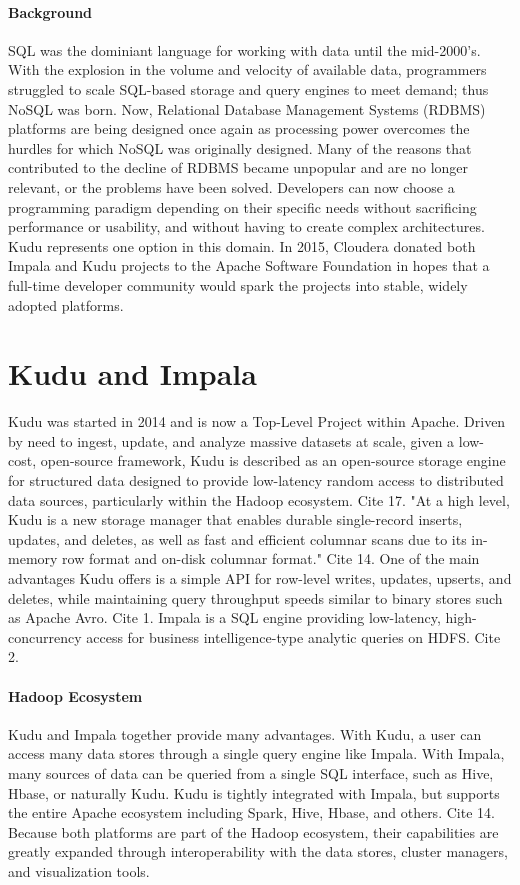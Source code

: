 \paragraph{Background}
SQL was the dominiant language for working with data until the mid-2000's.  With the explosion in the volume and velocity of available data, programmers struggled to scale SQL-based storage and query engines to meet demand; thus NoSQL was born. Now, Relational Database Management Systems (RDBMS) platforms are being designed once again as processing power overcomes the hurdles for which NoSQL was originally designed. Many of the reasons that contributed to the decline of RDBMS became unpopular and are no longer relevant, or the problems have been solved. Developers can now choose a programming paradigm depending on their specific needs without sacrificing performance or usability, and without having to create complex architectures.  Kudu represents one option in this domain. In 2015, Cloudera donated both Impala and Kudu projects to the Apache Software Foundation in hopes that a full-time developer community would spark the projects into stable, widely adopted platforms. 

\section{Kudu and Impala}
Kudu was started in 2014 and is now a Top-Level Project within Apache. Driven by need to ingest, update, and analyze massive datasets at scale, given a low-cost, open-source framework, Kudu is described as an open-source storage engine for structured data designed to provide low-latency random access to distributed data sources, particularly within the Hadoop ecosystem. Cite 17. "At a high level, Kudu is a new storage manager that enables durable single-record inserts, updates, and deletes, as well as fast and efficient columnar scans due to its in-memory row format and on-disk columnar format."  Cite 14. One of the main advantages Kudu offers is a simple API for row-level writes, updates, upserts, and deletes, while maintaining query throughput speeds similar to binary stores such as Apache Avro. Cite 1. Impala is a SQL engine providing low-latency, high-concurrency access for business intelligence-type analytic queries on HDFS.  Cite 2. 

\paragraph{Hadoop Ecosystem}
Kudu and Impala together provide many advantages.  With Kudu, a user can access many data stores through a single query engine like Impala. With Impala, many sources of data can be queried from a single SQL interface, such as Hive, Hbase, or naturally Kudu. Kudu is tightly integrated with Impala, but supports the entire Apache ecosystem including Spark, Hive, Hbase, and others. Cite 14. Because both platforms are part of the Hadoop ecosystem, their capabilities are greatly expanded through interoperability with the data stores, cluster managers, and visualization tools. 


